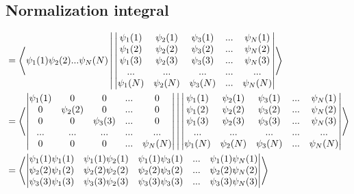 \documentclass[a4paper]{article}
\begin{document}
\subsection{Normalization integral}
 
 \begin{equation}
 \begin{aligned}
 &= \Braket{  \psi_1(1)\psi_2(2)...\psi_N(N)  |
 \begin{vmatrix} \psi_1(1) & \psi_2(1)& \psi_3(1) & ... & \psi_N(1) \\
    \psi_1(2) & \psi_2(2) & \psi_3(2) &...& \psi_N(2) \\
    \psi_1(3) & \psi_2(3) & \psi_3(3) &...& \psi_N(3) \\
    ... & ... & ... & ...& ... \\
    \psi_1(N) & \psi_2(N) & \psi_3(N) &...& \psi_N(N)\\
    \end{vmatrix} } \\
    &=
    \Braket{ 
     \begin{vmatrix} \psi_1(1) &0 & 0&... & 0 \\
    0 & \psi_2(2) & 0& ...& 0\\
    0 & 0 & \psi_3(3)& ...& 0\\
    ... & ... & ... & ... &...\\
    0 & 0 & 0&...& \psi_N(N)\\
    \end{vmatrix}  
    |
   \begin{vmatrix} \psi_1(1) & \psi_2(1)& \psi_3(1) & ... & \psi_N(1) \\
    \psi_1(2) & \psi_2(2) & \psi_3(2) &...& \psi_N(2) \\
    \psi_1(3) & \psi_2(3) & \psi_3(3) &...& \psi_N(3) \\
    ... & ... & ... & ...& ... \\
    \psi_1(N) & \psi_2(N) & \psi_3(N) &...& \psi_N(N)\\
    \end{vmatrix} } \\
    &=
      \Braket{ 
    \begin{vmatrix} 
    \psi_1(1) \psi_1(1) & \psi_1(1)\psi_2(1)& \psi_1(1)\psi_3(1) & ... & \psi_1(1) \psi_N(1) \\
    \psi_2(2) \psi_1(2) & \psi_2(2)\psi_2(2) & \psi_2(2) \psi_3(2) &...& \psi_2(2)\psi_N(2) \\
    \psi_3(3) \psi_1(3) & \psi_3(3)\psi_2(3) & \psi_3(3) \psi_3(3) &...& \psi_3(3)\psi_N(3) \\

\end{vmatrix}}
\end{aligned}
\end{equation}
\end{document}
